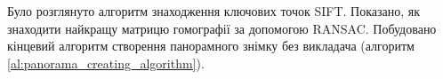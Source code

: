 \chapterConclusion

Було розглянуто алгоритм знаходження ключових точок SIFT.
Показано, як знаходити найкращу матрицю гомографії за 
допомогою RANSAC. Побудовано кінцевий алгоритм створення
панорамного знімку без викладача (алгоритм \ref{al:panorama_creating_algorithm}).
